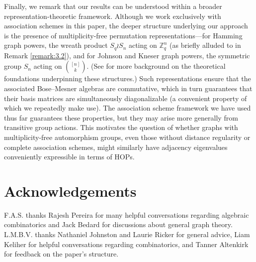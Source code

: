 \documentclass{article}
\def\Z{\mathbb{Z}}
\numberwithin{equation}{section}
\theoremstyle{plain}
\begin{document}
Finally, we remark that our results can be understood within a broader representation-theoretic framework. Although we work exclusively with association schemes in this paper, the deeper structure underlying our approach is the presence of multiplicity-free permutation representations---for Hamming graph powers, the wreath product $S_q \wr S_n$ acting on $\Z_q^n$ (as briefly alluded to in Remark \ref{remark:3.2}), and for Johnson and Kneser graph powers, the symmetric group $S_n$ acting on $\binom{[n]}{k}$. (See \cite{CSST08} for more background on the theoretical foundations underpinning these structures.) Such representations ensure that the associated Bose--Mesner algebras are commutative, which in turn guarantees that their basis matrices are simultaneously diagonalizable (a convenient property of which we repeatedly make use). The association scheme framework we have used thus far guarantees these properties, but they may arise more generally from transitive group actions. This motivates the question of whether graphs with multiplicity-free automorphism groups, even those without distance regularity or complete association schemes, might similarly have adjacency eigenvalues conveniently expressible in terms of HOPs.

\section*{Acknowledgements}

F.A.S. thanks Rajesh Pereira for many helpful conversations regarding
algebraic combinatorics and Jack Bedard for discussions about general
graph theory. L.M.B.V. thanks Nathaniel Johnston and Laurie Ricker
for general advice, Liam Keliher for helpful conversations regarding
combinatorics, and Tanner Altenkirk for feedback on the paper's structure.



\end{document}
